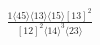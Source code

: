 \documentclass[varwidth, border=5pt]{standalone}
\begin{document}
\begin{my}
$\begin{gathered}
\scriptscriptstyle\frac{1⟨45⟩⟨13⟩⟨15⟩[13]^2}{[12]^2⟨14⟩^3⟨23⟩}
\end{gathered}$
\end{my}
\end{document}
